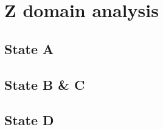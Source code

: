\chapter{Z domain analysis}
\label{ch:ZDomainAnalysis}

\section{State A}


\clearpage
\section{State B \& C}


\clearpage
\section{State D}

